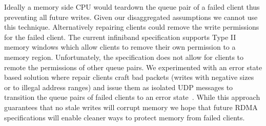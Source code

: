 Ideally a memory side CPU would teardown the queue pair of a
failed client thus preventing all future writes. Given our
disaggregated assumptions we cannot use this technique.
Alternatively repairing clients could remove the write
permissions for the failed client. The current infiniband
specification supports Type II memory windows which allow
clients to remove their own permission to a memory region.
Unfortunately, the specification does not allow for clients
to remote the permissions of other queue pairs. We
experimented with an error state based solution where repair
clients craft bad packets (writes with negative sizes or to
illegal address ranges) and issue them as isolated UDP
messages to transition the queue pairs of failed clients to
an error state~\cite{redmark}. While this approach
guarantees that no stale writes will corrupt memory we hope
that future RDMA specifications will enable cleaner ways to
protect memory from failed clients.



